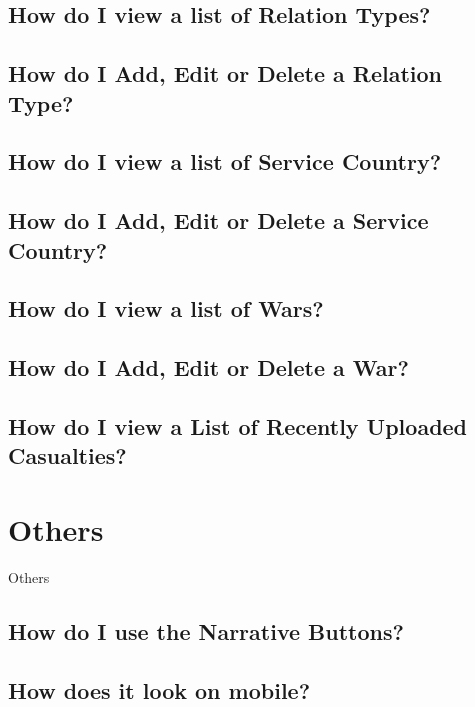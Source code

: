 \documentclass[12pt]{article}
\begin{document}
\subsection{How do I view a list of Relation Types?}
\subsection{How do I Add, Edit or Delete a Relation Type?}
\subsection{How do I view a list of Service Country?}
\subsection{How do I Add, Edit or Delete a Service Country?}
\subsection{How do I view a list of Wars?}
\subsection{How do I Add, Edit or Delete a War?}
\subsection{How do I view a List of Recently Uploaded Casualties?}

\section{Others}
Others
\subsection{How do I use the Narrative Buttons?}\label{ssec:narrative}
\subsection{How does it look on mobile?}\label{ssec:mobile}
\end{document}
